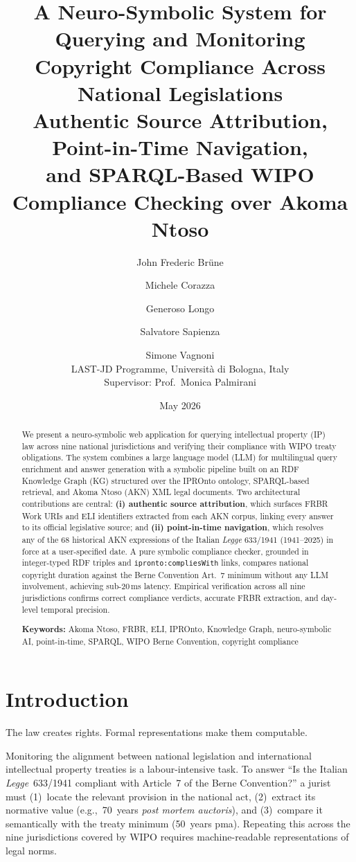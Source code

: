 \documentclass[12pt,a4paper]{article}
\title{
  \textbf{A Neuro-Symbolic System for Querying and Monitoring\\[0.3em]
  Copyright Compliance Across National Legislations}\\[0.6em]
  \large Authentic Source Attribution, Point-in-Time Navigation,\\[0.2em]
  and SPARQL-Based WIPO Compliance Checking over Akoma Ntoso
}
\author{
  John Frederic Br\"{u}ne \and
  Michele Corazza \and
  Generoso Longo \and
  Salvatore Sapienza \and
  Simone Vagnoni\\[0.4em]
  \small LAST-JD Programme, Universit\`{a} di Bologna, Italy\\[0.2em]
  \small Supervisor: Prof.\ Monica Palmirani
}
\date{May 2026}
\begin{document}
\maketitle
\thispagestyle{fancy}

\begin{abstract}
\noindent
We present a neuro-symbolic web application for querying intellectual
property (IP) law across nine national jurisdictions and verifying their
compliance with WIPO treaty obligations. The system combines a large
language model (LLM) for multilingual query enrichment and answer
generation with a symbolic pipeline built on an RDF Knowledge Graph (KG)
structured over the IPROnto ontology, SPARQL-based retrieval, and Akoma
Ntoso (AKN) XML legal documents. Two architectural contributions are
central: \textbf{(i) authentic source attribution}, which surfaces FRBR
Work URIs and ELI identifiers extracted from each AKN corpus, linking
every answer to its official legislative source; and \textbf{(ii)
point-in-time navigation}, which resolves any of the 68 historical AKN
expressions of the Italian \emph{Legge} 633/1941 (1941--2025) in force at
a user-specified date. A pure symbolic compliance checker, grounded in
integer-typed RDF triples and \texttt{ipronto:compliesWith} links, compares
national copyright duration against the Berne Convention Art.~7 minimum
without any LLM involvement, achieving sub-20\,ms latency. Empirical
verification across all nine jurisdictions confirms correct compliance
verdicts, accurate FRBR extraction, and day-level temporal precision.

\medskip
\noindent\textbf{Keywords:} Akoma Ntoso, FRBR, ELI, IPROnto, Knowledge
Graph, neuro-symbolic AI, point-in-time, SPARQL, WIPO Berne Convention,
copyright compliance
\end{abstract}

\newpage

\section{Introduction}

The law creates rights. Formal representations make them computable.

Monitoring the alignment between national legislation and international
intellectual property treaties is a labour-intensive task. To answer
``Is the Italian \emph{Legge}~633/1941 compliant with Article~7 of the
Berne Convention?'' a jurist must (1)~locate the relevant provision in the
national act, (2)~extract its normative value (e.g.,~70~years \emph{post
mortem auctoris}), and (3)~compare it semantically with the treaty minimum
(50~years pma). Repeating this across the nine jurisdictions covered by
WIPO requires machine-readable representations of legal norms.
\end{document}
